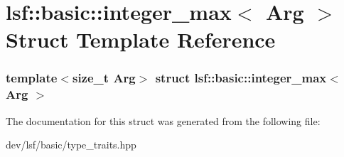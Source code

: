 \hypertarget{structlsf_1_1basic_1_1integer__max_3_01Arg_01_4}{
\section{lsf::basic::integer\_\-max$<$ Arg $>$ Struct Template Reference}
\label{structlsf_1_1basic_1_1integer__max_3_01Arg_01_4}
}
\subsubsection*{template$<$size\_\-t Arg$>$ struct lsf::basic::integer\_\-max$<$ Arg $>$}



The documentation for this struct was generated from the following file:\begin{DoxyCompactItemize}
\item 
dev/lsf/basic/type\_\-traits.hpp\end{DoxyCompactItemize}
